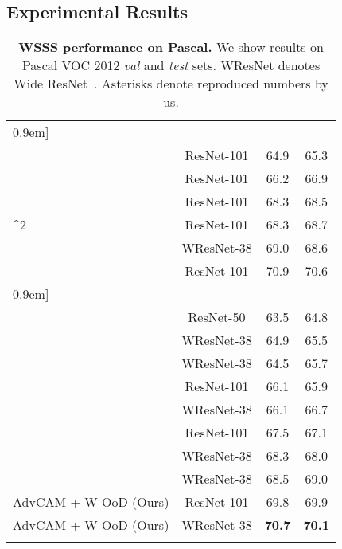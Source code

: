 \documentclass[10pt,twocolumn,letterpaper]{article}
\begin{document}
\subsection{Experimental Results}
\begin{table}[t]
\renewcommand{\arraystretch}{0.95}
\centering
  \caption{\textbf{WSSS performance on Pascal.} We show results on Pascal VOC 2012 \textit{val} and \textit{test} sets. WResNet denotes Wide ResNet~\cite{wu2019wider}. Asterisks  denote reproduced numbers by us.}\label{table_semantic}
\vspace{-0.7em}
\begin{threeparttable}
\begin{tabular}{l@{\hskip 0.1in}c@{\hskip 0.1in}cc}
    \Xhline{1pt}\-0.9em]
    
\multicolumn{3}{l}{Supervision: Image-level tags + Saliency}\\
~\cite{lee2019ficklenet}  & ResNet-101 & 64.9 & 65.3\\
~\cite{sun2020mining}   & ResNet-101  & 66.2  & 66.9  \\
~\cite{yao2021nonsalient}   & ResNet-101  & 68.3  & 68.5  \\
    ^2~\cite{zhang2021affinity}   & ResNet-101  &   68.3 & 68.7\\
    ~\cite{xu2021leveraging}    & WResNet-38 & 69.0  & 68.6 \\
~\cite{wu2021embedded}    & ResNet-101 & 70.9  & 70.6 \\
\-0.9em]
     \multicolumn{3}{l}{Supervision: Image-level tags}\\
    ~\cite{ahn2019weakly}  &  ResNet-50 & 63.5 & 64.8 \\
    ~\cite{Shimoda_2019_ICCV}    & WResNet-38   & 64.9  & 65.5\\
    ~\cite{wang2020self}    & WResNet-38 & 64.5  & 65.7 \\


    ~\cite{chang2020weakly}   & ResNet-101  & 66.1  & 65.9\\


    ~\cite{zhang2020causal}   & WResNet-38  & 66.1  & 66.7  \\

    ~\cite{lee2021anti} & ResNet-101 & 67.5 & 67.1  \\
    ~\cite{kweon2021unlocking} & WResNet-38 & 68.3 & 68.0  \\


    ~\cite{li2021pseudo} & WResNet-38 & 68.5 & 69.0  \\
        AdvCAM + W-OoD (Ours) & ResNet-101 &  69.8 &  69.9 \\

    AdvCAM + W-OoD (Ours) & WResNet-38 & \textbf{70.7} & \textbf{70.1}  \\
\Xhline{1pt}
    
    \end{tabular}\end{threeparttable}
\vspace{-1em}

      \end{table} 
\end{document}
